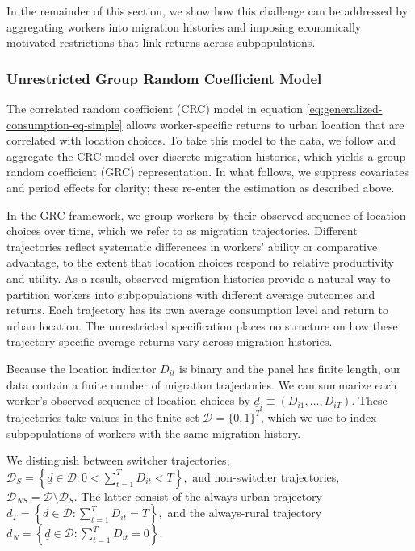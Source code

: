 In the remainder of this section, we show how this challenge can be addressed by aggregating workers into migration histories and imposing economically motivated restrictions that link returns across subpopulations.


\subsubsection{Unrestricted Group Random Coefficient Model}\label{subsec:unrestricted-grc-model}
The correlated random coefficient (CRC) model in equation \eqref{eq:generalized-consumption-eq-simple} allows worker-specific returns to urban location that are correlated with location choices. 
To take this model to the data, we follow \cite{tjernstromCommentSuri2011} and aggregate the CRC model over discrete migration histories, which yields a  group random coefficient (GRC) representation.
In what follows, we suppress covariates and period effects for clarity; these re-enter the estimation as described above. 

In the GRC framework, we group workers by their observed sequence of location choices over time, which we refer to as migration trajectories.
Different trajectories reflect systematic differences in workers' ability or comparative advantage, to the extent that location choices respond to relative productivity and utility.
As a result, observed migration histories provide a natural way to partition workers into subpopulations with different average outcomes and returns.
Each trajectory has its own average consumption level and return to urban location.
The unrestricted specification places no structure on how these trajectory-specific average returns vary across migration histories.

Because the location indicator $D_{it}$ is binary and the panel has finite length, our data contain a finite number of migration trajectories.
We can summarize each worker's observed sequence of location choices by $\underline d_i\equiv(D_{i1},\dots,D_{iT})$.
These trajectories take values in the finite set $\mathcal D=\{0,1\}^T$, which we use to index subpopulations of workers with the same migration history.

We distinguish between switcher trajectories,
$\mathcal D_S = \left\{ \underline d \in \mathcal D : 0 < \sum_{t=1}^T D_{it} < T \right\},$
and non-switcher trajectories,
$\mathcal D_{NS} = \mathcal D \setminus \mathcal D_S.$
The latter consist of the always-urban trajectory
$d_T = \left\{ \underline d \in \mathcal D : \sum_{t=1}^T D_{it} = T \right\},$ and the always-rural trajectory
$d_N = \left\{ \underline d \in \mathcal D : \sum_{t=1}^T D_{it} = 0 \right\}.$

